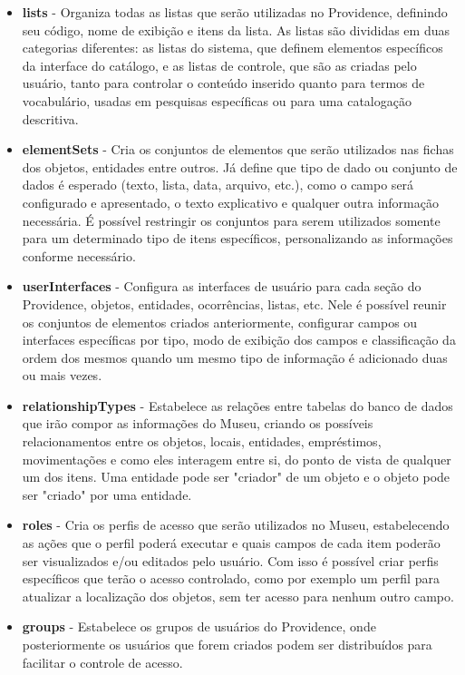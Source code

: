\documentclass[a4paper,12pt,oneside,onecolumn,final,fleqn]{repUERJ}
\begin{document}
\begin{itemize}
	\item \textbf{lists} - Organiza todas as listas que serão utilizadas no Providence, definindo seu código, nome de exibição e itens da lista. As listas são divididas em duas categorias diferentes: as listas do sistema, que definem elementos específicos da interface do catálogo, e as listas de controle, que são as criadas pelo usuário, tanto para controlar o conteúdo inserido quanto para termos de vocabulário, usadas em pesquisas específicas ou para uma catalogação descritiva.
	\item \textbf{elementSets} - Cria os conjuntos de elementos que serão utilizados nas fichas dos objetos, entidades entre outros. Já define que tipo de dado ou conjunto de dados é esperado (texto, lista, data, arquivo, etc.), como o campo será configurado e apresentado, o texto explicativo e qualquer outra informação necessária. É possível restringir os conjuntos para serem utilizados somente para um determinado tipo de itens específicos, personalizando as informações conforme necessário.
	\item \textbf{userInterfaces} - Configura as interfaces de usuário para cada seção do Providence, objetos, entidades, ocorrências, listas, etc. Nele é possível reunir os conjuntos de elementos criados anteriormente, configurar campos ou interfaces específicas por tipo, modo de exibição dos campos e classificação da ordem dos mesmos quando um mesmo tipo de informação é adicionado duas ou mais vezes. 
	\item \textbf{relationshipTypes} - Estabelece as relações entre tabelas do banco de dados que irão compor as informações do Museu, criando  os possíveis relacionamentos entre os objetos, locais, entidades, empréstimos, movimentações e como eles interagem entre si, do ponto de vista de qualquer um dos itens. Uma entidade pode ser "criador" de um objeto e o objeto pode ser "criado" por uma entidade.
	\item \textbf{roles} - Cria os perfis de acesso que serão utilizados no Museu, estabelecendo as ações que o perfil poderá executar e quais campos de cada item poderão ser visualizados e/ou editados pelo usuário. Com isso é possível criar perfis específicos que terão o acesso controlado, como por exemplo um perfil para atualizar a localização dos objetos, sem ter acesso para nenhum outro campo.
	\item \textbf{groups} - Estabelece os grupos de usuários do Providence, onde posteriormente os usuários que forem criados podem ser distribuídos para facilitar o controle de acesso.

\end{itemize}
\end{document}
